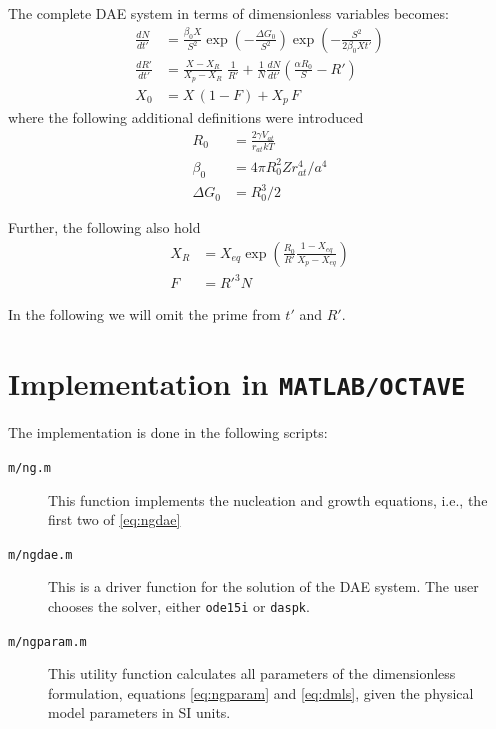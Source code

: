 \documentclass[12pt,a4paper]{article}
\begin{document}
The complete DAE system in terms of dimensionless variables becomes:
\begin{subequations}
\label{eq:ngdae}
\begin{align}
\frac{dN}{dt'} &= 
\frac{\beta_0 X}{S^2} 
\exp\left( -\frac{\Delta G_0}{S^2}\right)  
\exp\left( -\frac{S^2}{2\beta_0 X t'}\right)  \\
\frac{dR'}{dt'} &=  
\frac{X - X_R}{X_p - X_R} 
\; \frac{1}{R'}
+ 
\frac{1}{N}\frac{dN}{dt'}
\left( \frac{\alpha R_0}{S} - R' \right) \\
X_0 &= X\,(1-F) + X_p\,F
\end{align}
\end{subequations}
where the following additional definitions were introduced
\begin{subequations}
\label{eq:ngparam}
\begin{align}
R_0 &= \frac{2\gamma V_{at}}{r_{at}kT} \\ 
\beta_0 &= 4\pi R_0^2 Z r_{at}^4/ a^4 \\
\Delta G_0 &= R_0^3/2  
\end{align}
\end{subequations}

Further, the following also hold
\begin{subequations}
\begin{align}
X_R &= X_{eq} \exp 
\left( \frac{R_0}{R'} \frac{1-X_{eq}}{X_p - X_{eq}}\right) \\
F &= R'^3 N
\end{align}
\end{subequations}

In the following we will omit the prime from $t'$ and $R'$.

\section{Implementation in \texttt{MATLAB/OCTAVE}}

The implementation is done in the following scripts:

\begin{description}
\item[\texttt{m/ng.m}] This function implements the nucleation and growth equations, i.e., the first two of \eqref{eq:ngdae}

\item[\texttt{m/ngdae.m}] This is a driver function for the solution of the DAE system. The user chooses the solver, either \texttt{ode15i} or  \texttt{daspk}. 

\item[\texttt{m/ngparam.m}] This utility function calculates all parameters of the dimensionless formulation, equations \eqref{eq:ngparam} and \eqref{eq:dmls}, given the physical model parameters in SI units.

\end{description}
\end{document}
